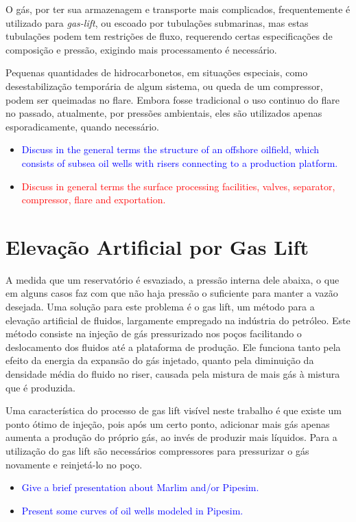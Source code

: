 O gás, por ter sua armazenagem e transporte mais complicados, frequentemente é utilizado para \textit{gas-lift}, ou escoado por tubulações submarinas, mas estas tubulações podem tem restrições de fluxo, requerendo certas especificações de composição e pressão, exigindo mais processamento é necessário.

Pequenas quantidades de hidrocarbonetos, em situações especiais, como desestabilização temporária de algum sistema, ou queda de um compressor, podem ser queimadas no flare. Embora fosse tradicional o uso continuo do flare no passado, atualmente, por pressões ambientais, eles são utilizados apenas esporadicamente, quando necessário.

\begin{itemize}

\item \textcolor{blue}{Discuss in the general terms the structure of an offshore oilfield, which consists of subsea oil wells with risers connecting to a production platform.}


\item \textcolor{red}{Discuss in general terms the surface processing facilities, valves, separator, compressor, flare and exportation.}

\end{itemize}



\section{Elevação Artificial por Gas Lift}

A medida que um reservatório é esvaziado, a pressão interna dele abaixa, o que em alguns casos faz com que não haja pressão o suficiente para manter a vazão desejada.
%
Uma solução para este problema é o gas lift, um método para a elevação artificial de fluidos, largamente empregado na indústria do petróleo.
%
Este método consiste na injeção de gás pressurizado nos poços facilitando o deslocamento dos fluidos até a plataforma de produção. 
%
Ele funciona tanto pela efeito da energia da expansão do gás injetado, quanto pela diminuição da densidade média do fluido no riser, causada pela mistura de mais gás à mistura que é produzida.
%


Uma característica do processo de gas lift visível neste trabalho é que existe um ponto ótimo de injeção, pois após um certo ponto, adicionar mais gás apenas aumenta a produção do próprio gás, ao invés de produzir mais líquidos.
%
Para a utilização do gas lift são necessários compressores para pressurizar o gás novamente e reinjetá-lo no poço.




\begin{itemize}

\item \textcolor{blue}{Give a brief presentation about Marlim and/or Pipesim.}

\item \textcolor{blue}{Present some curves of oil wells modeled in Pipesim.}


\end{itemize}
